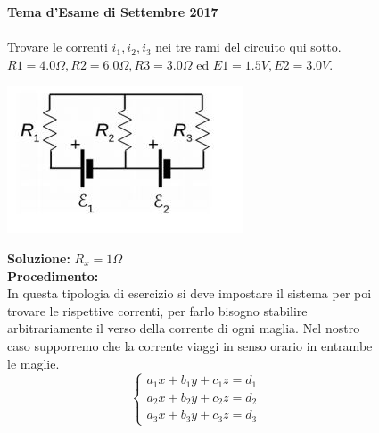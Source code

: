\begin{figure}[h!]
\textbf{Tema d'Esame di Settembre 2017}\\ \\
Trovare le correnti $i_1, i_2 , i_3$ nei tre rami del circuito qui sotto.
$R1 = 4.0 \Omega, R2 = 6.0 \Omega, R3 = 3.0 \Omega$ ed $ E 1 = 1.5 V,  E 2 = 3.0 V$.
	\begin{center}
		\includegraphics[scale=1.1]{ES5/SET052017.jpg}
	\end{center}
	\begin{boxed}
		\null\hfill \textbf{Soluzione:} $R_x = 1\Omega$\\
		\textbf{Procedimento: } \\
		In questa tipologia di esercizio si deve impostare il sistema per poi trovare le rispettive correnti, per farlo bisogno stabilire arbitrariamente il verso della corrente di ogni maglia. Nel nostro caso supporremo che la corrente viaggi in senso orario in entrambe le maglie.\\
		\[\left\{ 
		\begin{array}{c}
			a_1x+b_1y+c_1z=d_1 \\ 
			a_2x+b_2y+c_2z=d_2 \\ 
			a_3x+b_3y+c_3z=d_3
		\end{array}
		\right. 
		\]
		\end{boxed}
\end{figure}